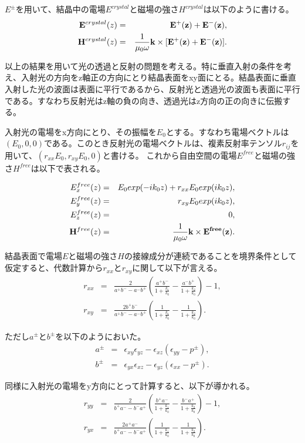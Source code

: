 \documentclass[11pt,a4paper]{jsarticle}
\begin{document}
$E^\pm$を用いて、結晶中の電場$E^{crystal}$と磁場の強さ$H^{crystal}$は以下のように書ける。
\begin{eqnarray}
{\bf E}^{crystal}(z) &=& {\bf E^+(z) + E^-(z) } ,\\
{\bf H}^{crystal}(z) &=& \frac{1}{\mu_0 \omega} {\bf k} \times [{\bf E^+(z) + E^-(z)}].
\end{eqnarray}


以上の結果を用いて光の透過と反射の問題を考える。特に垂直入射の条件を考え、入射光の方向をz軸正の方向にとり結晶表面をxy面にとる。結晶表面に垂直入射した光の波面は表面に平行であるから、反射光と透過光の波面も表面に平行である。すなわち反射光はz軸の負の向き、透過光はz方向の正の向きに伝搬する。

入射光の電場をx方向にとり、その振幅を$E_0$とする。すなわち電場ベクトルは$(E_0,0,0)$である。このとき反射光の電場ベクトルは、複素反射率テンソル$r_{ij}$を用いて、$(r_{xx}E_0, r_{xy}E_0,0)$と書ける。
これから自由空間の電場$E^{free}$と磁場の強さ$H^{free}$は以下で表される。

\begin{eqnarray}
E_x^{free} (z) &=& E_0 exp(-ik_0 z) + r_{xx}E_0 exp(ik_0 z),\\
E_y^{free} (z) &=& r_{xy}E_0 exp(ik_0 z),\\
E_z^{free} (z) &=& 0,\\
{\bf H}^{free}(z) &=& \frac{1}{\mu_0 \omega} {\bf k} \times {\bf E^{free}(z)}.
\end{eqnarray}


結晶表面で電場$E$と磁場の強さ$H$の接線成分が連続であることを境界条件として仮定すると、代数計算から$r_{xx}$と$r_{xy}$に関して以下が言える。
\begin{eqnarray}
r_{xx} &=& \frac{2}{a^+ b^- - a^- b^+} (\frac{a^+ b^-}{1+\frac{k_1}{k_0}} - \frac{a^- b^+}{1+\frac{k_2}{k_0}} )-1,\\
r_{xy} &=& \frac{2b^+ b^-}{a^+ b^- - a^- b^+} (\frac{1}{1+\frac{k_1}{k_0}} - \frac{1}{1+\frac{k_2}{k_0}} ).
\end{eqnarray}

ただし$a^\pm$と$b^\pm$を以下のようにおいた。
\begin{eqnarray}
a^\pm &=& \epsilon_{xy} \epsilon_{yz} - \epsilon_{xz}(\epsilon_{yy}-p^\pm),\\
b^\pm &=& \epsilon_{yx} \epsilon_{xz} - \epsilon_{yz}(\epsilon_{xx}-p^\pm).
\end{eqnarray}

同様に入射光の電場をy方向にとって計算すると、以下が導かれる。
\begin{eqnarray}
r_{yy} &=& \frac{2}{b^+ a^- - b^- a^+} (\frac{b^+ a^-}{1+\frac{k_1}{k_0}} - \frac{b^- a^+}{1+\frac{k_2}{k_0}} )-1,\\
r_{yx} &=& \frac{2a^+ a^-}{b^+ a^- - b^- a^+} (\frac{1}{1+\frac{k_1}{k_0}} - \frac{1}{1+\frac{k_2}{k_0}} ).
\end{eqnarray}
\end{document}
